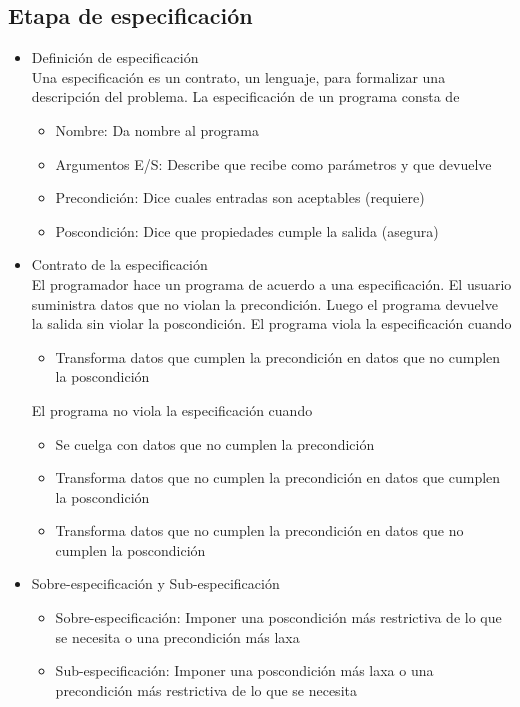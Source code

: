 \documentclass[a4paper,10pt]{article}
\begin{document}
\subsection{Etapa de especificación}
\begin{itemize}
	\item Definición de especificación \\
	Una especificación es un contrato, un lenguaje, para formalizar una descripción del problema. La especificación de un programa consta de
	\begin{itemize}
		\item Nombre: Da nombre al programa
		\item Argumentos E/S: Describe que recibe como parámetros y que devuelve
		\item Precondición: Dice cuales entradas son aceptables (requiere)
		\item Poscondición: Dice que propiedades cumple la salida (asegura)
	\end{itemize}
	\item Contrato de la especificación \\
	El programador hace un programa de acuerdo a una especificación. El usuario suministra datos que no violan la precondición. Luego el programa devuelve la salida sin violar la poscondición.
	El programa viola la especificación cuando
	\begin{itemize}
		\item Transforma datos que cumplen la precondición en datos que no cumplen la poscondición
	\end{itemize}
	El programa no viola la especificación cuando
	\begin{itemize}
		\item Se cuelga con datos que no cumplen la precondición
		\item Transforma datos que no cumplen la precondición en datos que cumplen la poscondición
		\item Transforma datos que no cumplen la precondición en datos que no cumplen la poscondición
	\end{itemize}
	\item Sobre-especificación y Sub-especificación
	\begin{itemize}
		\item Sobre-especificación: Imponer una poscondición más restrictiva de lo que se necesita o una precondición más laxa
		\item Sub-especificación: Imponer una poscondición más laxa o una precondición más restrictiva de lo que se necesita
	\end{itemize}
\end{itemize}
\end{document}
